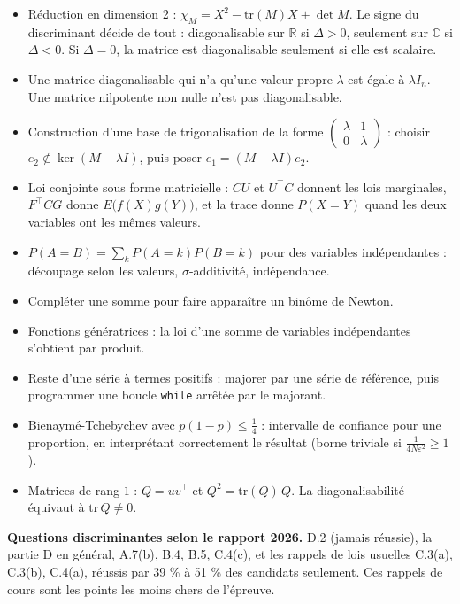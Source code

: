 \documentclass[11pt,a4paper]{article}
\providecommand{\tightlist}{\setlength{\itemsep}{0pt}\setlength{\parskip}{0pt}}
\begin{document}
\begin{itemize}
\tightlist
\item
  Réduction en dimension 2 : \(\chi_M=X^2-\mathrm{tr}(M)X+\det M\). Le signe du discriminant décide de tout : diagonalisable sur \(\mathbb{R}\) si \(\Delta>0\), seulement sur \(\mathbb{C}\) si \(\Delta<0\). Si \(\Delta=0\), la matrice est diagonalisable seulement si elle est scalaire.
\item
  Une matrice diagonalisable qui n'a qu'une valeur propre \(\lambda\) est égale à \(\lambda I_n\). Une matrice nilpotente non nulle n'est pas diagonalisable.
\item
  Construction d'une base de trigonalisation de la forme \(\begin{pmatrix}\lambda&1\\0&\lambda\end{pmatrix}\) : choisir \(e_2\notin\ker(M-\lambda I)\), puis poser \(e_1=(M-\lambda I)e_2\).
\item
  Loi conjointe sous forme matricielle : \(CU\) et \(U^\top C\) donnent les lois marginales, \(F^\top CG\) donne \(E\big(f(X)g(Y)\big)\), et la trace donne \(P(X=Y)\) quand les deux variables ont les mêmes valeurs.
\item
  \(P(A=B)=\sum_kP(A=k)P(B=k)\) pour des variables indépendantes : découpage selon les valeurs, \(\sigma\)-additivité, indépendance.
\item
  Compléter une somme pour faire apparaître un binôme de Newton.
\item
  Fonctions génératrices : la loi d'une somme de variables indépendantes s'obtient par produit.
\item
  Reste d'une série à termes positifs : majorer par une série de référence, puis programmer une boucle \texttt{while} arrêtée par le majorant.
\item
  Bienaymé-Tchebychev avec \(p(1-p)\le\frac14\) : intervalle de confiance pour une proportion, en interprétant correctement le résultat (borne triviale si \(\frac1{4N\varepsilon^2}\ge1\)).
\item
  Matrices de rang \(1\) : \(Q=uv^\top\) et \(Q^2=\mathrm{tr}(Q)\,Q\). La diagonalisabilité équivaut à \(\mathrm{tr}\,Q\neq0\).
\end{itemize}

\textbf{Questions discriminantes selon le rapport 2026.} D.2 (jamais réussie), la partie D en général, A.7(b), B.4, B.5, C.4(c), et les rappels de lois usuelles C.3(a), C.3(b), C.4(a), réussis par 39 \% à 51 \% des candidats seulement. Ces rappels de cours sont les points les moins chers de l'épreuve.
\end{document}
